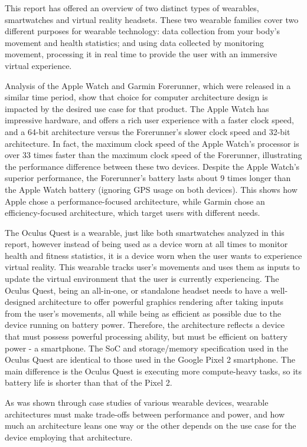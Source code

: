 This report has offered an overview of two distinct types of wearables,
smartwatches and virtual reality headsets. These two wearable families
cover two different purposes for wearable technology: data collection
from your body's movement and health statistics; and using data collected
by monitoring movement, processing it in real time to provide the user
with an immersive virtual experience.

Analysis of the Apple Watch and Garmin Forerunner, which were released
in a similar time period, show that choice for computer architecture
design is impacted by the desired use case for that product. The Apple
Watch has impressive hardware, and offers a rich user experience with
a faster clock speed, and a 64-bit architecture versus the Forerunner's
slower clock speed and 32-bit architecture. In fact, the maximum clock
speed of the Apple Watch's processor is over 33 times faster than the
maximum clock speed of the Forerunner, illustrating the performance difference 
between these two devices. Despite the Apple Watch's superior performance, the 
Forerunner's battery lasts about 9 times longer than the Apple Watch battery
(ignoring GPS usage on both devices). This shows how Apple chose a performance-focused
architecture, while Garmin chose an efficiency-focused architecture, which target
users with different needs.

The Oculus Quest is a wearable, just like both smartwatches analyzed in this report,
however instead of being used as a device worn at all times to monitor health and
fitness statistics, it is a device worn when the user wants to experience virtual reality.
This wearable tracks user's movements and uses them as inputs to update the virtual
environment that the user is currently experiencing. The Oculus Quest, being an
all-in-one, or standalone headset needs to have a well-designed architecture
to offer powerful graphics rendering after taking inputs from the user's movements,
all while being as efficient as possible due to the device running on battery power.
Therefore, the architecture reflects a device that must possess powerful processing
ability, but must be efficient on battery power - a smartphone. The SoC and storage/memory
specification used in the Oculus Quest are identical to those used in the Google Pixel
2 smartphone. The main difference is the Oculus Quest is executing more compute-heavy tasks,
so its battery life is shorter than that of the Pixel 2.

As was shown through case studies of various wearable devices, wearable architectures
must make trade-offs between performance and power, and how much an architecture
leans one way or the other depends on the use case for the device employing that
architecture.